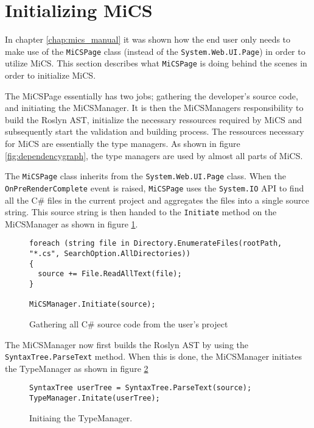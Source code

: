 \section{Initializing MiCS} %
\label{sec:initializing_mics}

In chapter \ref{chap:mics_manual} it was shown how the end user only needs to make use of the \texttt{MiCSPage} class (instead of the \texttt{System.Web.UI.Page}) in order to utilize MiCS. This section describes what \texttt{MiCSPage} is doing behind the scenes in order to initialize MiCS.

The MiCSPage essentially has two jobs; gathering the developer's source code, and initiating the MiCSManager. It is then the MiCSManagers responsibility to build the Roslyn AST, initialize the necessary ressources required by MiCS and subsequently start the validation and building process. The ressources necessary for MiCS are essentially the type managers. As shown in figure \ref{fig:dependencygraph}, the type managers are used by almost all parts of MiCS.

The \texttt{MiCSPage} class inherits from the \texttt{System.Web.UI.Page} class. When the \texttt{OnPreRenderComplete} event is raised, \texttt{MiCSPage} uses the \texttt{System.IO} API to find all the C\# files in the current project and aggregates the files into a single source string. This source string is then handed to the \texttt{Initiate} method on the MiCSManager as shown in figure \ref{fig:init_mics_gather_source_code}.

\begin{figure}[H]
\begin{lstlisting}[language=CSharp,classoffset=1,morekeywords={Directory,SearcOption,File,MiCSManager,ScriptManager}]
foreach (string file in Directory.EnumerateFiles(rootPath, "*.cs", SearchOption.AllDirectories))
{
  source += File.ReadAllText(file);
}

MiCSManager.Initiate(source);
\end{lstlisting}
\caption{Gathering all C\# source code from the user's project}
\label{fig:init_mics_gather_source_code}
\end{figure}

The MiCSManager now first builds the Roslyn AST by using the \texttt{SyntaxTree.ParseText} method. When this is done, the MiCSManager initiates the TypeManager as shown in figure \ref{fig:init_mics_init_typemanager}

\begin{figure}[H]
\begin{lstlisting}[language=CSharp,classoffset=1,morekeywords={TypeManager,SyntaxTree}]
SyntaxTree userTree = SyntaxTree.ParseText(source);
TypeManager.Initate(userTree);
\end{lstlisting}
\caption{Initiaing the TypeManager.}
\label{fig:init_mics_init_typemanager}
\end{figure}

